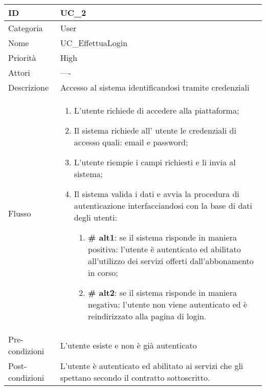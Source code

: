 \begin{center}
\begin{tabular}{ |p{2cm}|p{13cm}|  }
\hline
ID & UC\_2 \\\hline
Categoria & User \\\hline
Nome & UC\_EffettuaLogin \\\hline
Priorità & High \\\hline
Attori &  ---- \\\hline
Descrizione & Accesso al sistema identificandosi tramite credenziali \\\hline
Flusso &  	\begin{enumerate}
			\item L'utente richiede di accedere alla piattaforma;
			\item Il sistema richiede all' utente le credenziali di accesso quali: email e password;
			\item L'utente riempie i campi richiesti e li invia al sistema;
			\item Il sistema valida i dati e avvia la procedura di autenticazione interfacciandosi con la base di dati degli utenti:
			\begin{enumerate}[  ]
				\item \textbf{\# alt1}: se il sistema risponde in maniera positiva: l'utente è autenticato ed abilitato all'utilizzo dei servizi offerti dall'abbonamento in corso; 
				\item \textbf{\# alt2}: se il sistema risponde in maniera negativa: l'utente non viene autenticato ed è reindirizzato alla pagina di login.
			\end{enumerate}
		\end{enumerate}\\\hline
Pre-condizioni &  L'utente esiste e non è già autenticato\\\hline
Post-condizioni &  L'utente è autenticato ed abilitato ai servizi che gli spettano secondo il contratto sottoscritto.\\\hline
\end{tabular}
\label{table_use_case:2}\newline


\end{center}
